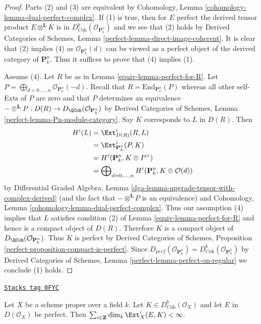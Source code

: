 \begin{proof}

Parts (2) and (3) are equivalent by
Cohomology, Lemma \ref{cohomology-lemma-dual-perfect-complex}.
If (1) is true, then for $E$ perfect the derived tensor product
$E \otimes^\mathbf{L} K$ is in
$D^b_{\textit{Coh}}(\mathcal{O}_{\mathbf{P}^n_k})$
and we see that (2) holds by
Derived Categories of Schemes, Lemma \ref{perfect-lemma-direct-image-coherent}.
It is clear that (2) implies (4) as $\mathcal{O}_{\mathbf{P}^n_k}(d)$
can be viewed
as a perfect object of the derived category of $\mathbf{P}^n_k$.
Thus it suffices to prove that (4) implies (1).

\medskip\noindent
Assume (4). Let $R$ be as in Lemma \ref{equiv-lemma-perfect-for-R}.
Let $P = \bigoplus_{d = 0, \ldots, n} \mathcal{O}_{\mathbf{P}^n_k}(-d)$.
Recall that $R = \text{End}_{\mathbf{P}^n_k}(P)$ whereas all other
self-Exts of $P$ are zero and that $P$ determines an equivalence
$- \otimes^\mathbf{L} P : D(R) \to D_\QCoh(\mathcal{O}_{\mathbf{P}^n_k})$
by Derived Categories of Schemes, Lemma \ref{perfect-lemma-Pn-module-category}.
Say $K$ corresponds to $L$ in $D(R)$. Then
\begin{align*}
H^i(L)
& =
\Ext^i_{D(R)}(R, L) \\
& =
\Ext^i_{\mathbf{P}^n_k}(P, K) \\
& =
H^i(\mathbf{P}^n_k, K \otimes P^\vee) \\
& =
\bigoplus\nolimits_{d = 0, \ldots, n}
H^i(\mathbf{P}^n_k, K \otimes \mathcal{O}(d))
\end{align*}
by Differential Graded Algebra, Lemma
\ref{dga-lemma-upgrade-tensor-with-complex-derived}
(and the fact that $- \otimes^\mathbf{L} P$ is an equivalence)
and Cohomology, Lemma \ref{cohomology-lemma-dual-perfect-complex}.
Thus our assumption (4) implies that $L$ satisfies condition (2) of
Lemma \ref{equiv-lemma-perfect-for-R} and hence is a compact object of $D(R)$.
Therefore $K$ is a compact object of
$D_\QCoh(\mathcal{O}_{\mathbf{P}^n_k})$.
Thus $K$ is perfect by
Derived Categories of Schemes, Proposition
\ref{perfect-proposition-compact-is-perfect}.
Since $D_{perf}(\mathcal{O}_{\mathbf{P}^n_k}) =
D^b_{\textit{Coh}}(\mathcal{O}_{\mathbf{P}^n_k})$
by
Derived Categories of Schemes, Lemma \ref{perfect-lemma-perfect-on-regular}
we conclude (1) holds.
\end{proof}

\begin{lemma}[Finiteness]
\label{equiv-lemma-finiteness}
\href{https://stacks.math.columbia.edu/tag/0FYC}{\texttt{Stacks tag 0FYC}}

Let $X$ be a scheme proper over a field $k$. Let
$K \in D^b_{\textit{Coh}}(\mathcal{O}_X)$ and let $E$ in $D(\mathcal{O}_X)$
be perfect. Then
$\sum_{i \in \mathbf{Z}} \dim_k \Ext^i_X(E, K) < \infty$.
\end{lemma}

